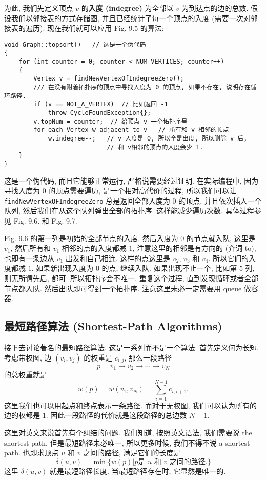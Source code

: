 \documentclass[a4paper]{ctexart}
\theoremstyle{definition}
\theoremstyle{definition}
\begin{document}
为此, 我们先定义顶点 $v$ 的{\bf 入度 (indegree)} 为全部以
$v$ 为到达点的边的总数. 假设我们以邻接表的方式存储图,
并且已经统计了每一个顶点的入度 (需要一次对邻接表的遍历).
现在我们就可以应用 Fig. 9.5 的算法:

\begin{verbatim}
void Graph::topsort()   // 这是一个伪代码
{
    for (int counter = 0; counter < NUM_VERTICES; counter++)
    {
        Vertex v = findNewVertexOfIndegreeZero();
        /// 在没有附着拓扑序的顶点中寻找入度为 0 的顶点, 如果不存在, 说明存在循环路径.
        if (v == NOT_A_VERTEX)  // 比如返回 -1
            throw CycleFoundException{};
        v.topNum = counter;  // 给顶点 v 一个拓扑序号
        for each Vertex w adjacent to v   // 所有和 v 相邻的顶点
            w.indegree--;   // v 入度是 0, 所以全是出度, 所以删除 v 后, 
                            // 和 v相邻的顶点的入度会少 1.
    }
}
\end{verbatim}

这是一个伪代码, 而且它能够正常运行, 严格说需要经过证明. 在实际编程中,
因为寻找入度为 0 的顶点需要遍历, 是一个相对高代价的过程,
所以我们可以让 \verb|findNewVertexOFIndegreeZero|
总是返回全部入度为 0 的顶点, 并且依次插入一个队列,
然后我们在从这个队列弹出全部的拓扑序.
这样能减少遍历次数. 具体过程参见 Fig. 9.6. 和 Fig. 9.7.

Fig. 9.6 的第一列是初始的全部节点的入度. 然后入度为 $0$ 的节点就入队,
这里是 $v_1$, 然后所有和 $v_1$ 相邻的点的入度都减 $1$, 注意这里的相邻是有方向的
(介词 to), 也即有一条边从 $v_1$ 出发和自己相连. 这样的点这里是 $v_2$, $v_3$ 和
$v_4$. 所以它们的入度都减 $1$. 如果新出现入度为 $0$ 的点, 继续入队. 如果出现不止一个,
比如第 $5$ 列, 则无所谓先后, 都可. 所以拓扑序会不唯一. 重复这个过程,
直到发现循环或者全部节点都入队. 然后出队即可得到一个拓扑序.
注意这里未必一定需要用 queue 做容器.

\subsection{最短路径算法 (Shortest-Path Algorithms)}
接下去讨论著名的最短路径算法. 这是一系列而不是一个算法.
首先定义何为长短. 考虑带权图, 边 $(v_i, v_j)$ 的权重是 $c_{i, j}$,
那么一段路径
$$
p = v_1 \to v_2 \to \cdots \to v_N
$$
的总权重就是
$$
w(p) = w(v_1, v_N) = \sum_{i = 1}^{N - 1}c_{i, i + 1}.
$$
这里我们也可以用起点和终点表示一条路径. 而对于无权图, 我们可以认为所有的边的权都是 $1$.
因此一段路径的代价就是这段路径的总边数 $N - 1$. 

 这里对英文来说首先有个纠结的问题. 我们知道,
按照英文语法, 我们需要说 the shortest path. 但是最短路径未必唯一, 所以更多时候,
我们不得不说 a shortest path. 也即求顶点 $u$ 和 $v$ 之间的路径, 满足它们的长度是
$$
\delta(u, v) = \min \{w(p) | p \mbox{是 $u$ 和 $v$ 之间的路径.}\}
$$
这里 $\delta(u, v)$ 就是最短路径长度. 当最短路径存在时, 它显然是唯一的.
\end{document}
